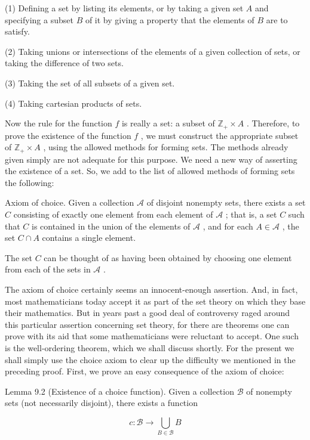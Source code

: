 \documentclass[10pt]{article}
\begin{document}
(1) Defining a set by listing its elements, or by taking a given set \(A\) and specifying a subset \(B\) of it by giving a property that the elements of \(B\) are to satisfy.

(2) Taking unions or intersections of the elements of a given collection of sets, or taking the difference of two sets.

(3) Taking the set of all subsets of a given set.

(4) Taking cartesian products of sets.

Now the rule for the function \(f\) is really a set: a subset of \({\mathbb{Z}}_{ + } \times  A\) . Therefore, to prove the existence of the function \(f\) , we must construct the appropriate subset of \({\mathbb{Z}}_{ + } \times  A\) , using the allowed methods for forming sets. The methods already given simply are not adequate for this purpose. We need a new way of asserting the existence of a set. So, we add to the list of allowed methods of forming sets the following:

Axiom of choice. Given a collection \(\mathcal{A}\) of disjoint nonempty sets, there exists a set \(C\) consisting of exactly one element from each element of \(\mathcal{A}\) ; that is, a set \(C\) such that \(C\) is contained in the union of the elements of \(\mathcal{A}\) , and for each \(A \in  \mathcal{A}\) , the set \(C \cap  A\) contains a single element.

The set \(C\) can be thought of as having been obtained by choosing one element from each of the sets in \(\mathcal{A}\) .

The axiom of choice certainly seems an innocent-enough assertion. And, in fact, most mathematicians today accept it as part of the set theory on which they base their mathematics. But in years past a good deal of controversy raged around this particular assertion concerning set theory, for there are theorems one can prove with its aid that some mathematicians were reluctant to accept. One such is the well-ordering theorem, which we shall discuss shortly. For the present we shall simply use the choice axiom to clear up the difficulty we mentioned in the preceding proof. First, we prove an easy consequence of the axiom of choice:

Lemma 9.2 (Existence of a choice function). Given a collection \(\mathcal{B}\) of nonempty sets (not necessarily disjoint), there exists a function

\[
c : \mathcal{B} \rightarrow  \mathop{\bigcup }\limits_{{B \in  \mathcal{B}}}B
\]
\end{document}

